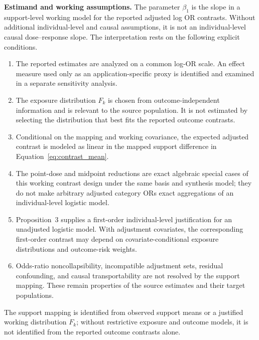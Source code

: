 \documentclass[journal=rsm]{CUP-JNL-DTM}%
\theoremstyle{definition}
\numberwithin{equation}{section}
\begin{document}
\noindent\textbf{Estimand and working assumptions.}
The parameter $\beta_1$ is the slope in a support-level working model for the
reported adjusted log OR contrasts. Without additional individual-level and
causal assumptions, it is not an individual-level causal dose--response slope.
The interpretation rests on the following explicit conditions.
\begin{enumerate}
  \item The reported estimates are analyzed on a common log-OR scale. An effect
  measure used only as an application-specific proxy is identified and examined
  in a separate sensitivity analysis.
  \item The exposure distribution $F_k$ is chosen from outcome-independent
  information and is relevant to the source population. It is not estimated by
  selecting the distribution that best fits the reported outcome contrasts.
  \item Conditional on the mapping and working covariance, the expected
  adjusted contrast is modeled as linear in the mapped support difference in
  Equation~\eqref{eq:contrast_mean}.
  \item The point-dose and midpoint reductions are exact algebraic special cases
  of this working contrast design under the same basis and synthesis model; they
  do not make arbitrary adjusted category ORs exact aggregations of an
  individual-level logistic model.
  \item Proposition~3 supplies a first-order individual-level justification for
  an unadjusted logistic model. With adjustment covariates, the corresponding
  first-order contrast may depend on covariate-conditional exposure
  distributions and outcome-risk weights.
  \item Odds-ratio noncollapsibility, incompatible adjustment sets, residual
  confounding, and causal transportability are not resolved by the support
  mapping. These remain properties of the source estimates and their target
  populations.
\end{enumerate}
The support mapping is identified from observed support means or a justified
working distribution $F_k$; without restrictive exposure and outcome models,
it is not identified from the reported outcome contrasts alone.
\end{document}
